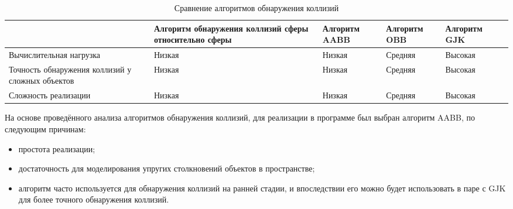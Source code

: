 \noindent
\begin{table}[H]
    \caption{Сравнение алгоритмов обнаружения коллизий}
    \label{tab:collisions}
\begin{adjustbox}{width=1\textwidth}
    \begin{tabular}{|p{}|p{}|p{}|p{}|p{}|p{}|}
        \hline
        &
        Алгоритм обнаружения коллизий сферы относительно сферы
        &
        Алгоритм AABB
        &
        Алгоритм OBB
        &
        Алгоритм GJK
        \\
        \hline
        Вычислительная нагрузка
        &
        Низкая
        &
        Низкая
        &
        Средняя
        &
        Высокая
        \\
        \hline
        Точность обнаружения коллизий у сложных объектов
        &
        Низкая
        &
        Низкая
        &
        Средняя
        &
        Высокая
        \\
        \hline
        Сложность реализации
        &
        Низкая
        &
        Низкая
        &
        Средняя
        &
        Высокая
        \\
        \hline
    \end{tabular}
\end{adjustbox}
\end{table}

На основе проведённого анализа алгоритмов обнаружения коллизий, для реализации в программе был выбран алгоритм AABB, по следующим причинам:
\begin{itemize}
    \item простота реализации;
    \item достаточность для моделирования упругих столкновений объектов в пространстве;
    \item алгоритм часто используется для обнаружения коллизий на ранней стадии, и впоследствии его можно будет использовать в паре с GJK для более точного обнаружения коллизий. %
\end{itemize}

